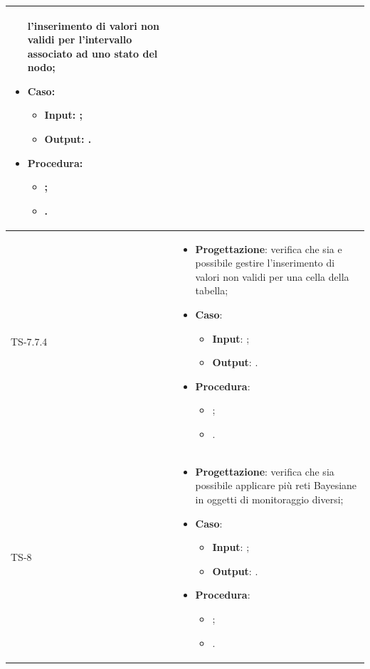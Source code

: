 \begin{longtable}{|C{2.5cm}|C{13cm}|}
\begin{itemize}
	l'inserimento di valori non validi per l'intervallo associato ad uno stato del
	nodo;
	\item \textbf{Caso}: 
	\begin{itemize}
		\item \textbf{Input}: ;
		\item \textbf{Output}: .
	\end{itemize}
	\item \textbf{Procedura}:
	\begin{itemize}
		\item ;
		\item .
	\end{itemize} 
\end{itemize}
	 \\
	\hline
	{TS-7.7.4} & 
\begin{itemize}
	\item \textbf{Progettazione}: verifica che sia e possibile gestire
	l'inserimento di valori non validi per una cella della tabella;
	\item \textbf{Caso}: 
	\begin{itemize}
		\item \textbf{Input}: ;
		\item \textbf{Output}: .
	\end{itemize}
	\item \textbf{Procedura}:
	\begin{itemize}
		\item ;
		\item .
	\end{itemize} 
\end{itemize}
	 \\
	\hline
	{TS-8} & 
\begin{itemize}
	\item \textbf{Progettazione}: verifica che sia possibile applicare più reti
	Bayesiane in oggetti di monitoraggio diversi;
	\item \textbf{Caso}: 
	\begin{itemize}
		\item \textbf{Input}: ;
		\item \textbf{Output}: .
	\end{itemize}
	\item \textbf{Procedura}:
	\begin{itemize}
		\item ;
		\item .
	\end{itemize} 
\end{itemize}
	 \\

\end{longtable}
